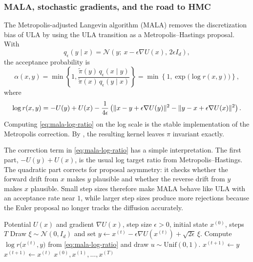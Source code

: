 \subsubsection{MALA, stochastic gradients, and the road to HMC}
\label{subsubsec:mala}

The Metropolis-adjusted Langevin algorithm (MALA) removes the discretization bias of ULA by using the ULA transition as a Metropolis--Hastings proposal.
With
\begin{equation}
  q_\epsilon(y\mid x)
  =
  \mathcal{N}\!\left(y;\ x-\epsilon\nabla U(x),\,2\epsilon I_d\right),
  \label{eq:mala-proposal}
\end{equation}
the acceptance probability is
\begin{equation}
  \alpha(x,y)
  =
  \min\!\left\{1,\frac{\tilde\pi(y)\,q_\epsilon(x\mid y)}{\tilde\pi(x)\,q_\epsilon(y\mid x)}\right\}
  =
  \min\!\left\{1,\exp\!\bigl(\log r(x,y)\bigr)\right\},
  \label{eq:mala-accept}
\end{equation}
where
\begin{equation}
  \log r(x,y)
  =
  -U(y)+U(x)
  -\frac{1}{4\epsilon}
  \left(
    \lVert x-y+\epsilon\nabla U(y)\rVert^2
    -
    \lVert y-x+\epsilon\nabla U(x)\rVert^2
  \right).
  \label{eq:mala-log-ratio}
\end{equation}
Computing \eqref{eq:mala-log-ratio} on the log scale is the stable implementation of the Metropolis correction.
By , the resulting kernel leaves $\pi$ invariant exactly.

The correction term in \eqref{eq:mala-log-ratio} has a simple interpretation.
The first part, $-U(y)+U(x)$, is the usual log target ratio from Metropolis--Hastings.
The quadratic part corrects for proposal asymmetry: it checks whether the forward drift from $x$ makes $y$ plausible and whether the reverse drift from $y$ makes $x$ plausible.
Small step sizes therefore make MALA behave like ULA with an acceptance rate near $1$, while larger step sizes produce more rejections because the Euler proposal no longer tracks the diffusion accurately.

\begin{algorithm}[t]
  \caption{Metropolis-adjusted Langevin algorithm (MALA)}
  \label{alg:mala}
  \begin{algorithmic}[1]
    \Require Potential $U(x)$ and gradient $\nabla U(x)$, step size $\epsilon>0$, initial state $x^{(0)}$, steps $T$
      \State Draw $\xi\sim\mathcal{N}(0,I_d)$ and set $y \gets x^{(t)}-\epsilon\nabla U(x^{(t)})+\sqrt{2\epsilon}\,\xi$.
      \State Compute $\log r\bigl(x^{(t)},y\bigr)$ from \eqref{eq:mala-log-ratio} and draw $u\sim\mathrm{Unif}(0,1)$.
        \State $x^{(t+1)} \gets y$
      \Else
        \State $x^{(t+1)} \gets x^{(t)}$
      \EndIf
    \EndFor
    \State \Return $x^{(0)},x^{(1)},\dots,x^{(T)}$
  \end{algorithmic}
\end{algorithm}

